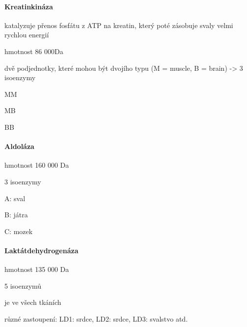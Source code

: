 \documentclass[DIV=8]{scrreprt}
\begin{document}
\paragraph{Kreatinkináza}
\begin{myItemize}[nosep]
    \item katalyzuje přenos fosfátu z ATP na kreatin, který poté zásobuje svaly velmi rychlou energií
    \item hmotnost 86 000Da
    \item dvě podjednotky, které mohou být dvojího typu (M = muscle, B = brain)
    -> 3 isoenzymy
\begin{myItemize}[nosep]
    \item MM
    \item MB
    \item BB
\end{myItemize}

\end{myItemize}



\paragraph{Aldoláza}
\begin{myItemize}[nosep]
    \item hmotnost 160 000 Da
    \item 3 isoenzymy
\begin{myItemize}[nosep]
    \item A: sval
    \item B: játra
    \item C: mozek
\end{myItemize}

\end{myItemize}



\paragraph{Laktátdehydrogenáza}
\begin{myItemize}[nosep]
    \item hmotnost 135 000 Da
    \item 5 isoenzymů
    \item je ve všech tkáních
    \item různé zastoupení: LD1: srdce, LD2: srdce, LD3: svalstvo atd.
\end{myItemize}
\end{document}
